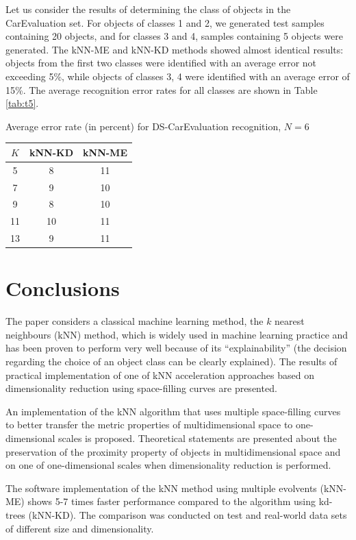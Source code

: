 \documentclass[entropy,article,submit,moreauthors,pdftex]{Definitions/mdpi}
\begin{document}
\begin{paracol}{2}
Let us consider the results of determining the class of objects in the CarEvaluation set. For objects of classes 1 and 2, we generated test samples containing 20 objects, and for classes 3 and 4, samples containing 5 objects were generated. The kNN-ME and kNN-KD methods showed almost identical results: objects from the first two classes were identified with an average error not exceeding 5\%, while objects of classes 3, 4 were identified with an average error of 15\%. The average recognition error rates for all classes are shown in Table \ref{tab:t5}.

\begin{specialtable}[H] 
  \caption{Average error rate (in percent) for DS-CarEvaluation recognition, $N = 6$}\label{tab:t5}
	\center
\begin{tabular}{ccc}
\toprule
$K$ & kNN-KD & kNN-ME \\
\midrule													
5 & 8 & 11 \\
7 & 9 & 10 \\
9 & 8 & 10 \\
11 & 10 & 11 \\
13 & 9 & 11 \\
\bottomrule
\end{tabular}
\end{specialtable}

\section{Conclusions}\label{conclusions}

The paper considers a classical machine learning method, the $k$ nearest neighbours (kNN) method, which is widely used in machine learning practice and has been proven to perform very well because of its ``explainability'' (the decision  regarding the choice of an object class can be clearly explained). The results of practical implementation of one of kNN acceleration approaches based on dimensionality reduction using space-filling curves are presented.

An implementation of the kNN algorithm that uses multiple space-filling curves to better transfer the metric properties of multidimensional space to one-dimensional scales is proposed. Theoretical statements are presented about the preservation of the proximity property of objects in multidimensional space and on one of one-dimensional scales when dimensionality reduction is performed.

The software implementation of the kNN method using multiple evolvents (kNN-ME) shows 5-7 times faster performance compared to the algorithm using kd-trees (kNN-KD). The comparison was conducted on test and real-world data sets of different size and dimensionality. 


\end{paracol}
\end{document}
